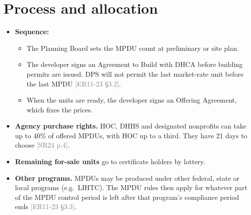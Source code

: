 \documentclass[11pt]{article}
\newcommand{\src}[1]{\textcolor{gray}{\small[#1]}}
\begin{document}
\section{Process and allocation}
\begin{itemize}
  \item \textbf{Sequence:}
    \begin{itemize}
      \item The Planning Board sets the MPDU count at preliminary or site plan.
      \item The developer signs an Agreement to Build with DHCA before building permits are issued. DPS will not permit the last market-rate unit before the last MPDU \src{ER11-23 \S3.2}.
      \item When the units are ready, the developer signs an Offering Agreement, which fixes the prices.
    \end{itemize}
  \item \textbf{Agency purchase rights.} HOC, DHHS and designated nonprofits can take up to 40\% of offered MPDUs, with HOC up to a third. They have 21 days to choose \src{SR24 p.4}.
  \item \textbf{Remaining for-sale units} go to certificate holders by lottery.
  \item \textbf{Other programs.} MPDUs may be produced under other federal, state or local programs (e.g.\ LIHTC). The MPDU rules then apply for whatever part of the MPDU control period is left after that program's compliance period ends \src{ER11-23 \S3.3}.
\end{itemize}

\end{document}
